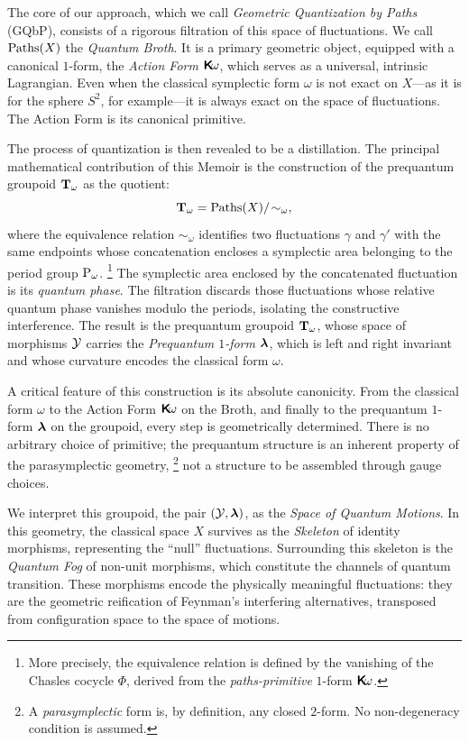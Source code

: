 The core of our approach,
which we call \emph{Geometric Quantization by Paths} (GQbP),
consists of a rigorous filtration of this space of fluctuations.
We call $\operatorname{Paths}(X)$ the \emph{Quantum Broth}.
It is a primary geometric object,
equipped with a canonical $1$-form,
the \emph{Action Form} $\boldsymbol{\mathsf{K}}\!\omega$,
which serves as a universal,
intrinsic Lagrangian.
Even when the classical symplectic form $\omega$ is not exact on $X$---as it is for the sphere $S^2$, for example---it is always exact on the space of fluctuations.
The Action Form is its canonical primitive.

The process of quantization is then revealed to be a distillation.
The principal mathematical contribution of this Memoir is the construction of the prequantum groupoid ${\mathbf T}_\omega$ as the quotient:
\[
  {\mathbf T}_\omega = \operatorname{Paths}(X)/\!\sim_\omega,
  \]
where the equivalence relation $\sim_\omega$ identifies two fluctuations $\gamma$ and $\gamma'$
with the same endpoints whose concatenation encloses a symplectic area belonging to the period group $\operatorname{P}_\omega$.%
\footnote{More precisely,
the equivalence relation is defined by the vanishing of the Chasles cocycle $\Phi$,
derived from the \emph{paths-primitive} $1$-form $\boldsymbol{\mathsf{K}}\!\omega$.}
The symplectic area enclosed by the concatenated fluctuation is its \emph{quantum phase}.
The filtration discards those fluctuations whose relative quantum phase vanishes modulo the periods,
isolating the constructive interference.
The result is the prequantum groupoid ${\mathbf T}_\omega$,
whose space of morphisms $\mathcal{Y}$ carries the \emph{Prequantum $1$-form} $\boldsymbol \lambda$,
which is left and right invariant and whose curvature encodes the classical form $\omega$.

A critical feature of this construction is its absolute canonicity.
From the classical form $\omega$ to the Action Form $\boldsymbol{\mathsf{K}}\!\omega$ on the Broth,
and finally to the prequantum $1$-form $\boldsymbol \lambda$ on the groupoid,
every step is geometrically determined.
There is no arbitrary choice of primitive;
the prequantum structure is an inherent property of the parasymplectic geometry,%
\footnote{A \emph{parasymplectic} form is,
by definition,
any closed $2$-form.
No non-degeneracy condition is assumed.}
not a structure to be assembled through gauge choices.

We interpret this groupoid,
the pair $(\mathcal{Y},\boldsymbol \lambda)$,
as the \emph{Space of Quantum Motions}.
In this geometry,
the classical space $X$ survives as the \emph{Skeleton} of identity morphisms,
representing the ``null'' fluctuations.
Surrounding this skeleton is the \emph{Quantum Fog} of non-unit morphisms,
which constitute the channels of quantum transition.
These morphisms encode the physically meaningful fluctuations:
they are the geometric reification of Feynman's interfering alternatives,
transposed from configuration space to the space of motions.

